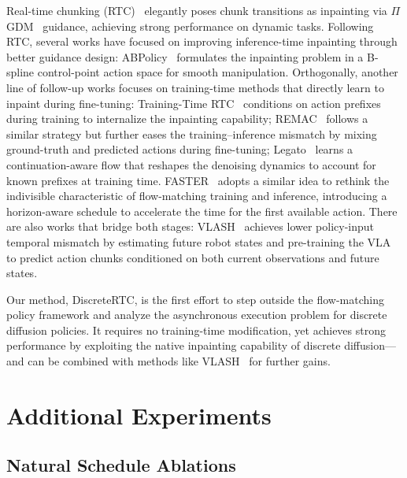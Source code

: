 \documentclass{article}
\begin{document}
Real-time chunking (RTC)~\citep{black2025real} elegantly poses chunk transitions as inpainting via $\Pi$GDM~\citep{song2023pseudoinverse} guidance, achieving strong performance on dynamic tasks.
Following RTC, several works have focused on improving inference-time inpainting through better guidance design:
ABPolicy~\citep{yang2026abpolicy} formulates the inpainting problem in a B-spline control-point action space for smooth manipulation.
Orthogonally, another line of follow-up works focuses on training-time methods that directly learn to inpaint during fine-tuning:
Training-Time RTC~\citep{black2025training} conditions on action prefixes during training to internalize the inpainting capability;
REMAC~\citep{wang2026real} follows a similar strategy but further eases the training--inference mismatch by mixing ground-truth and predicted actions during fine-tuning;
Legato~\citep{liu2026learning} learns a continuation-aware flow that reshapes the denoising dynamics to account for known prefixes at training time.
FASTER~\citep{lu2026faster} adopts a similar idea to rethink the indivisible characteristic of flow-matching training and inference, introducing a horizon-aware schedule to accelerate the time for the first available action.
There are also works that bridge both stages: VLASH~\citep{tang2025vlash} achieves lower policy-input temporal mismatch by estimating future robot states and pre-training the VLA to predict action chunks conditioned on both current observations and future states.

Our method, DiscreteRTC, is the first effort to step outside the flow-matching policy framework and analyze the asynchronous execution problem for discrete diffusion policies. It requires no training-time modification, yet achieves strong performance by exploiting the native inpainting capability of discrete diffusion---and can be combined with methods like VLASH~\citep{tang2025vlash} for further gains.



\newpage
\section{Additional Experiments}
\label{app: addexp}
\subsection{Natural Schedule Ablations}
\label{app: naturalmask}
\end{document}
